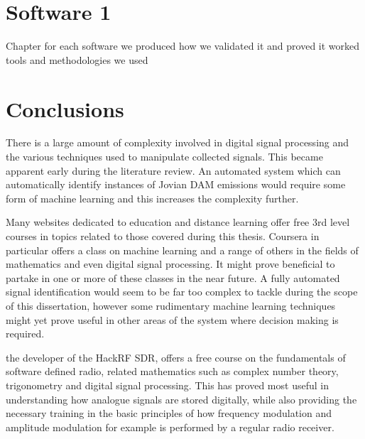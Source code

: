 \documentclass[runningheads,a4paper]{llncs}
\begin{document}
% 
\newpage
\chapter*{Software 1}

Chapter for each software we produced how we validated it and proved it worked tools and methodologies we used


%
%
\newpage
\chapter*{Conclusions}


There is a large amount of complexity involved in digital signal processing and the various techniques used to manipulate collected signals. This became apparent early during the literature review. An automated system which can automatically identify instances of Jovian \gls{DAM} emissions would require some form of machine learning and this increases the complexity further.

Many websites dedicated to education and distance learning offer free 3rd level courses in topics related to those covered during this thesis. Coursera in particular offers a class on machine learning and a range of others in the fields of mathematics and even digital signal processing. It might prove beneficial to partake in one or more of these classes in the near future. A fully automated signal identification would seem to be far too complex to tackle during the scope of this dissertation, however some rudimentary machine learning techniques might yet prove useful in other areas of the system where decision making is required.

\cite{ossmann-15-a} the developer of the HackRF \gls{SDR}, offers a free course on the fundamentals of software defined radio, related mathematics such as complex number theory, trigonometry and digital signal processing. This has proved most useful in understanding how analogue signals are stored digitally, while also providing the necessary training in the basic principles of how frequency modulation and amplitude modulation for example is performed by a regular radio receiver. 
\end{document}
